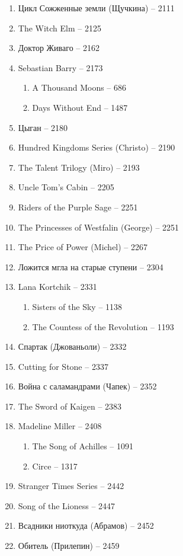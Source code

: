 \documentclass[a4paper, 11pt]{proc} %
\begin{document}
\begin{enumerate}
    \item Цикл Сожженные земли (Щучкина) -- 2111
    \item The Witch Elm -- 2125
    \item Доктор Живаго -- 2162
    \item Sebastian Barry -- 2173
        \begin{enumerate}
            \item A Thousand Moons -- 686
            \item Days Without End -- 1487
        \end{enumerate}
    \item Цыган -- 2180
    \item Hundred Kingdoms Series (Christo) -- 2190
    \item The Talent Trilogy (Miro) -- 2193
    \item Uncle Tom's Cabin -- 2205
    \item Riders of the Purple Sage -- 2251
    \item The Princesses of Westfalin (George) -- 2251
    \item The Price of Power (Michel) -- 2267
    \item Ложится мгла на старые ступени -- 2304
    \item Lana Kortchik -- 2331
        \begin{enumerate}
            \item Sisters of the Sky -- 1138
            \item The Countess of the Revolution -- 1193
        \end{enumerate}
    \item Спартак (Джованьоли) -- 2332
    \item Cutting for Stone -- 2337
    \item Война с саламандрами (Чапек) -- 2352
    \item The Sword of Kaigen -- 2383
    \item Madeline Miller -- 2408
        \begin{enumerate}
            \item The Song of Achilles -- 1091
            \item Circe -- 1317
        \end{enumerate}
    \item Stranger Times Series -- 2442
    \item Song of the Lioness -- 2447
    \item Всадники ниоткуда (Абрамов) -- 2452
    \item Обитель (Прилепин) -- 2459

\end{enumerate}
\end{document}
